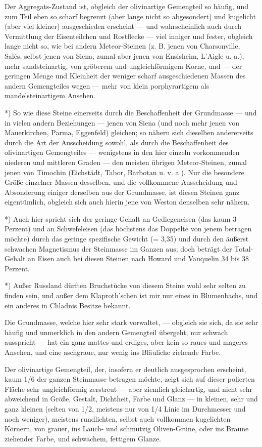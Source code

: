 \documentclass[a4paper, 11pt, oneside, german]{article}
\begin{document}
Der Aggregats-Zustand ist, obgleich der olivinartige Gemengteil so häufig, und zum Teil eben so scharf begrenzt (aber lange nicht so abgesondert) und kugelicht (aber viel kleiner) ausgeschieden erscheint --- und wahrscheinlich auch durch Vermittlung der Eisenteilchen und Rostflecke --- viel inniger und fester, obgleich lange nicht so, wie bei andern Meteor-Steinen (z. B. jenen von Charsonville, Salés, selbst jenen von Siena, zumal aber jenen von Ensisheim, L'Aigle u. a.), mehr sandsteinartig, von gröberem und ungleichförmigem Korne, und --- der geringen Menge und Kleinheit der weniger scharf ausgeschiedenen Massen des andern Gemengteiles wegen --- mehr von klein porphyrartigem als mandelsteinartigem Ansehen.

*) So wie diese Steine einerseits durch die Beschaffenheit der Grundmasse --- und in vielen andern Beziehungen --- jenen von Siena (und noch mehr jenen von Mauerkirchen, Parma, Eggenfeld) gleichen; so nähern sich dieselben andererseits durch die Art der Ausscheidung sowohl, als durch die Beschaffenheit des olivinartigen Gemengteiles --- wenigstens in den hier einzeln vorkommenden niederen und mittleren Graden --- den meisten übrigen Meteor-Steinen, zumal jenen von Timochin (Eichstädt, Tabor, Barbotan u. v. a.). Nur die besondere Größe einzelner Massen desselben, und die vollkommene Ausscheidung und Absonderung einiger derselben aus der Grundmasse, ist diesen Steinen ganz eigentümlich, obgleich sich auch hierin jene von Weston denselben sehr nähern.

*) Auch hier spricht sich der geringe Gehalt an Gediegeneisen (das kaum 3 Perzent) und an Schwefeleisen (das höchstens das Doppelte von jenem betragen möchte) durch das geringe spezifische Gewicht (= 3,35) und durch den äußerst schwachen Magnetismus der Steinmasse im Ganzen aus; doch beträgt der Total-Gehalt an Eisen auch bei diesen Steinen nach Howard und Vauquelin 34 bis 38 Perzent.

*) Außer Russland dürften Bruchstücke von diesem Steine wohl sehr selten zu finden sein, und außer dem Klaproth'schen ist mir nur eines in Blumenbachs, und ein anderes in Chladnis Besitze bekannt.

Die Grundmasse, welche hier sehr stark vorwaltet, --- obgleich sie sich, da sie sehr häufig und unmerklich in den andern Gemengteil übergeht, nur schwach ausspricht --- hat ein ganz mattes und erdiges, aber kein so raues und mageres Ansehen, und eine aschgraue, nur wenig ins Bläuliche ziehende Farbe.

Der olivinartige Gemengteil, der, insofern er deutlich ausgesprochen erscheint, kaum 1/6 der ganzen Steinmasse betragen möchte, zeigt sich auf dieser polierten Fläche sehr ungleichförmig zerstreut --- aber ziemlich gleichartig, und nicht sehr abweichend in Größe, Gestalt, Dichtheit, Farbe und Glanz --- in kleinen, sehr und ganz kleinen (selten von 1/2, meistens nur von 1/4 Linie im Durchmesser und noch weniger), meistens rundlichten, selbst auch vollkommen kugelichten Körnern, von grauer, ins Lauch- und schmutzig Oliven-Grüne, oder ins Braune ziehender Farbe, und schwachem, fettigem Glanze.
\end{document}
